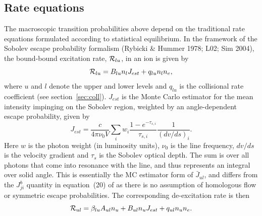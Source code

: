 \subsection{Rate equations}

The macroscopic transition probabilities above depend on the traditional
rate equations formulated according to statistical equilibrium. 
In the framework of the Sobolev escape probability formalism 
(Rybicki \& Hummer 1978; L02; Sim 2004), 
the bound-bound excitation rate, ${\cal R}_{lu}$, in an ion is given by 
\begin{equation}
{\cal R}_{lu} = B_{lu} n_l J_{est} + q_{lu} n_l n_e,
\label{eq:rad_rate}
\end{equation}
where $u$ and $l$ denote the upper and lower levels and $q_{lu}$ is the collisional
rate coefficient (see section~\ref{sec:coll}).
$J_{est}$ is the Monte Carlo estimator for the mean intensity 
impinging on the Sobolev region, weighted by an angle-dependent escape probability, 
given by \citep{sim2004}
\begin{equation}
J_{est} = \frac{c}{4 \pi \nu_0 V} \sum_{i} w_i \frac{1 - e^{-\tau_{s,i}}}{\tau_{s,i}} \frac{1}{(dv/ds)_i}.
\end{equation}
Here $w$ is the photon weight (in luminosity units), $\nu_0$
is the line frequency, $dv/ds$ is the velocity gradient and
$\tau_s$ is the Sobolev optical depth.
The sum is over all photons that come into resonance with the line,
and thus represents an integral over solid angle.
This is essentially the MC estimator form of $\bar{J}_{ul}$, and differs
from the $J^b_{ji}$ quantity in equation~(20) of \cite{lucy2002} as 
there is no assumption of homologous flow or symmetric escape probabilities.
The corresponding de-excitation rate is then 
\begin{equation}
{\cal R}_{ul} = \beta_{lu} A_{ul} n_u + B_{ul} n_u J_{est} +
q_{ul} n_u n_e.
\label{eq:nlte_rul}
\end{equation}


